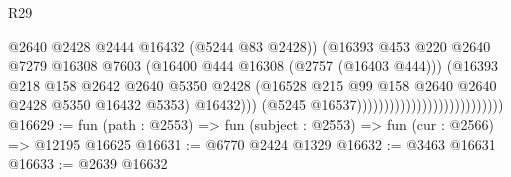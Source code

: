 \begin{lexlean}{R29}
\begin{coremodule}
                                                            @2640
                                                            @2428
                                                            @2444
                                                            @16432
                                                            (@5244 @83 @2428))
                                                          (@16393
                                                            @453
                                                            @220
                                                            @2640
                                                            @7279
                                                            @16308
                                                            @7603
                                                            (@16400
                                                              @444
                                                              @16308
                                                              (@2757 (@16403 @444)))
                                                            (@16393
                                                              @218
                                                              @158
                                                              @2642
                                                              @2640
                                                              @5350
                                                              @2428
                                                              (@16528
                                                                @215
                                                                @99
                                                                @158
                                                                @2640
                                                                @2640
                                                                @2428
                                                                @5350
                                                                @16432
                                                                @5353)
                                                              @16432)))
                                                        (@5245 @16537)))))))))))))))))))))))))))
@16629 := fun (path : @2553) => fun (subject : @2553) => fun (cur : @2566) => @12195 @16625
@16631 := @6770 @2424 @1329
@16632 := @3463 @16631
@16633 := @2639 @16632

\end{coremodule}
\end{lexlean}
